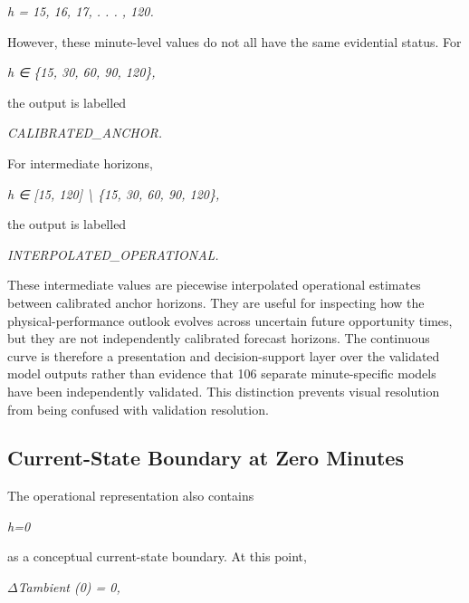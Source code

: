 \begin{center}\textit{h = 15, 16, 17, . . . , 120.}\end{center}

However, these minute-level values do not all have the same evidential status. For

\begin{center}\textit{h ∈ \{15, 30, 60, 90, 120\},}\end{center}

the output is labelled

\begin{center}\textit{CALIBRATED\_ANCHOR.}\end{center}

For intermediate horizons,

\begin{center}\textit{h ∈ [15, 120] \textbackslash{} \{15, 30, 60, 90, 120\},}\end{center}

the output is labelled

\begin{center}\textit{INTERPOLATED\_OPERATIONAL.}\end{center}

These intermediate values are piecewise interpolated operational estimates between calibrated anchor horizons. They are useful for inspecting how the physical-performance outlook evolves across uncertain future opportunity times, but they are not independently calibrated forecast horizons. The continuous curve is therefore a presentation and decision-support layer over the validated model outputs rather than evidence that 106 separate minute-specific models have been independently validated. This distinction prevents visual resolution from being confused with validation resolution.

\subsection{Current-State Boundary at Zero Minutes}
The operational representation also contains

\begin{center}\textit{h=0}\end{center}

as a conceptual current-state boundary. At this point,

\begin{center}\textit{\ensuremath{\Delta}Tambient (0) = 0,}\end{center}

